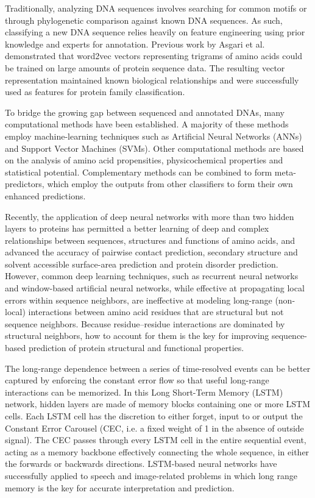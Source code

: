 \documentclass[conference]{IEEEtran}
\begin{document}
Traditionally, analyzing DNA sequences involves searching for common motifs or through phylogenetic comparison against known DNA sequences. As such, classifying a new DNA sequence relies heavily on feature engineering using prior knowledge and experts for annotation. Previous work by Asgari et al. demonstrated that word2vec vectors representing trigrams of amino acids could be trained on large amounts of protein sequence data. The resulting vector representation maintained known biological relationships and were successfully used as features for protein family classification.
\newline

To bridge the growing gap between sequenced and annotated DNAs, many computational methods have been established. A majority of these methods employ machine-learning techniques such as Artificial Neural Networks (ANNs) and Support Vector Machines (SVMs). Other computational methods are based on the
analysis of amino acid propensities, physicochemical properties and statistical potential. Complementary methods can be combined to form meta-predictors, which employ the outputs from other classifiers to form their own enhanced predictions.
\newline

Recently, the application of deep neural networks with more than two hidden layers to proteins has permitted a better learning of deep and complex relationships between sequences, structures and functions of amino acids, and advanced the accuracy of pairwise contact prediction, secondary structure and solvent accessible surface-area prediction and protein disorder prediction. However, common deep learning techniques, such as recurrent neural networks and window-based artificial neural networks, while effective at propagating local errors within sequence neighbors, are ineffective at modeling long-range (non-local) interactions between amino acid residues that are structural but not sequence neighbors. Because residue–residue interactions are dominated by structural neighbors, how to account for them is the key for improving sequence-based prediction of protein structural and functional properties.
\newline

The long-range dependence between a series of time-resolved
events can be better captured by enforcing the constant error flow so that useful long-range interactions can be memorized. In this Long Short-Term Memory (LSTM) network, hidden layers are made of memory blocks containing one or more LSTM cells. Each LSTM cell has the discretion to either forget, input to or output the Constant Error Carousel (CEC, i.e. a fixed weight of 1 in the absence of outside signal). The CEC passes through every LSTM cell in the entire sequential event, acting as a
memory backbone effectively connecting the whole sequence, in either the forwards or backwards directions. LSTM-based neural networks have successfully applied to speech and image-related problems in which long range memory is the key for accurate interpretation and prediction.
\newline
\end{document}
